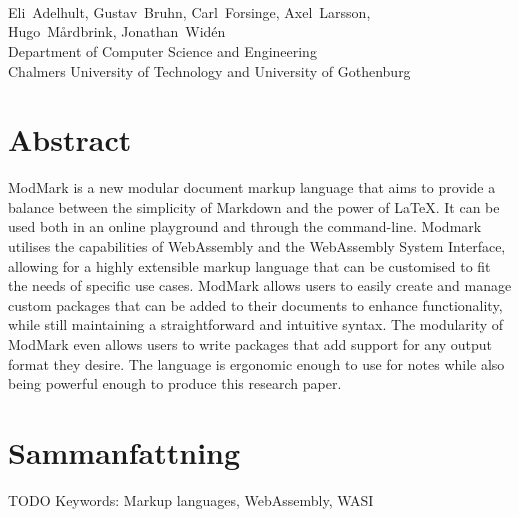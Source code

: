 \oneLineTitle\\
\oneLineSubtitle\\
\\
Eli~Adelhult, Gustav~Bruhn, Carl~Forsinge, Axel~Larsson,\\ Hugo~Mårdbrink, Jonathan~Widén\\

Department of Computer Science and Engineering\\
Chalmers University of Technology and University of Gothenburg

\thispagestyle{plain}			%
\section*{Abstract}
ModMark is a new modular document markup language that aims to provide a balance between the simplicity of Markdown and the power of \LaTeX. It can be used both in an online playground and through the command-line. Modmark utilises the capabilities of WebAssembly and the WebAssembly System Interface, allowing for a highly extensible markup language that can be customised to fit the needs of specific use cases. ModMark allows users to easily create and manage custom packages that can be added to their documents to enhance functionality, while still maintaining a straightforward and intuitive syntax. The modularity of ModMark even allows users to write packages that add support for any output format they desire. The language is ergonomic enough to use for notes while also being powerful enough to produce this research paper.

\section*{Sammanfattning}
TODO
\vfill
Keywords: Markup languages, WebAssembly, WASI

\newpage				%
\thispagestyle{empty}
\mbox{}